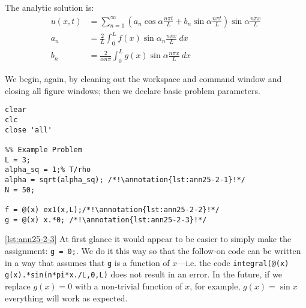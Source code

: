 \vspace{0.25cm}
\noindent The analytic solution is:
\begin{align*}
u(x,t) &= \sum\limits_{n=1}^{\infty} \left(a_n \cos{\alpha \frac{n \pi t}{L}} + b_n \sin{\alpha \frac{n \pi t}{L}} \right) \sin{\alpha \frac{n \pi x}{L}} \\
a_n &= \frac{2}{L} \int_{0}^{L} f(x) \sin{\alpha_n \frac{n \pi x}{L}} \ dx \\
b_n &= \frac{2}{\alpha n \pi} \int_{0}^{L} g(x) \sin{\alpha \frac{n \pi x}{L}} \ dx
\end{align*}

\setcounter{lstannotation}{0} %

\vspace{0.2cm}

\noindent We begin, again, by cleaning out the workspace and command window and closing all figure windows; then we declare basic problem parameters.
\begin{lstlisting}[name=lec25-ex2, style=myMatlab]
clear
clc
close 'all'

%% Example Problem
L = 3;
alpha_sq = 1;% T/rho
alpha = sqrt(alpha_sq); /*!\annotation{lst:ann25-2-1}!*/
N = 50;

f = @(x) ex1(x,L);/*!\annotation{lst:ann25-2-2}!*/
g = @(x) x.*0; /*!\annotation{lst:ann25-2-3}!*/
\end{lstlisting}
\vspace{0.2cm}

\ref{lst:ann25-2-3} At first glance it would appear to be easier to simply make the assignment: \lstinline[style=myMatlab]{g = 0;}.  We do it this way so that the follow-on code can be written in a way that assumes that \lstinline{g} is a function of $x$---i.e. the code \lstinline[style=myMatlab]{integral(@(x) g(x).*sin(n*pi*x./L,0,L)} does not result in an error. In the future, if we replace $g(x)=0$ with a  non-trivial function of $x$, for example, $g(x)=\sin{x}$ everything will work as expected.

